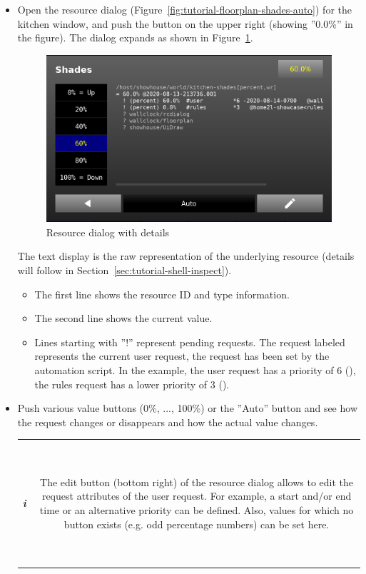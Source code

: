 \documentclass[12pt,english,parskip=half,headheight=19pt]{scrreprt}
\newcommand{\lst}[1]{\colorbox{lstbackground}{\footnotesize\code{#1}}}
\newcommand{\infobox}[1]{
  \par
  \medskip
  \hfill
  \setlength\arrayrulewidth{1pt}
  \begin{tabular}[t]{c|c|}
    \parbox{1.8em}{\hfill\textit{\Huge\textbf{i}\,}}
    &
    \,\parbox{0.89\linewidth}{\setlength{\parskip}{0.5em} \small #1}\,
  \end{tabular}
  \medskip
  \par
}
\begin{document}
\begin{itemize}[$\blacktriangleright$]

  \item
    Open the resource dialog (Figure~\ref{fig:tutorial-floorplan-shades-auto}) for the kitchen window,
    and push the button on the upper right (showing ''0.0\%'' in the figure). The dialog expands as
    shown in Figure~\ref{fig:tutorial-floorplan-shades-details}.

    \begin{figure}[ht]
      \centering
      \includegraphics[width=0.7\linewidth]{figs/wallclock-floorplan-shades-details.png}
      \caption[l]{Resource dialog with details}
      \label{fig:tutorial-floorplan-shades-details}
    \end{figure}

    The text display is the raw representation of the underlying resource (details will follow in
    Section~\ref{sec:tutorial-shell-inspect}).
    \begin{itemize}
      \item The first line shows the resource ID and type information.
      \item The second line shows the current value.
      \item Lines starting with ''!'' represent pending requests. The request labeled \lst{#user}
        represents the current user request, the request \lst{#rules} has been set by the
        automation script. In the example, the user request has a priority of 6 (\lst{*6}), the
        rules request has a lower priority of 3 (\lst{*3}).
    \end{itemize}

  \item
    Push various value buttons (0\%, ..., 100\%) or the ''Auto'' button and see how
    the \lst{#user} request changes or disappears and how the actual value changes.
    \infobox{
      The edit button (bottom right) of the resource dialog allows to edit the request attributes
      of the user request. For example, a start and/or end time or an alternative priority can be defined.
      Also, values for which no button exists (e.g. odd percentage numbers) can be set here.

}
\end{itemize}
\end{document}

